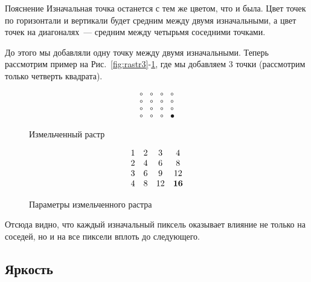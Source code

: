 \begin{callout}{Пояснение}
    Изначальная точка останется с тем же цветом, что и была. Цвет точек по горизонтали и вертикали будет средним между двумя изначальными, а цвет точек на диагоналях~--- средним между четырьмя соседними точками.
\end{callout}

До этого мы добавляли одну точку между двумя изначальными. Теперь рассмотрим пример на Рис.~\ref{fig:rastr3}-\ref{fig:rastr4}, где мы добавляем 3 точки (рассмотрим только четверть квадрата).

\begin{figure}[h!]
    \centering
    \begin{minipage}{0.3\textwidth}
        $$
            \begin{matrix}
                \circ & \circ & \circ & \circ   \\
                \circ & \circ & \circ & \circ   \\
                \circ & \circ & \circ & \circ   \\
                \circ & \circ & \circ & \bullet
            \end{matrix}
        $$
        \caption{Измельченный растр}
        \label{fig:rastr3}
    \end{minipage} %
    \hspace{0.1\textwidth}
    \begin{minipage}{0.3\textwidth}
        $$
            \begin{matrix}
                1 & 2 & 3  & 4       \\
                2 & 4 & 6  & 8       \\
                3 & 6 & 9  & 12      \\
                4 & 8 & 12 & \bf{16}
            \end{matrix}
        $$
        \caption{Параметры измельченного растра}
        \label{fig:rastr4}
    \end{minipage}
\end{figure}

Отсюда видно, что каждый изначальный пиксель оказывает влияние не только на соседей, но и на все пиксели вплоть до следующего.

\subsection{Яркость}

